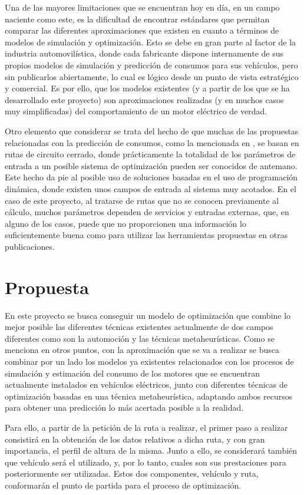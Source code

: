 \documentclass[11pt,spanish,listoffigures,listoftables]{tfgetsinf}
\begin{document}
Una de las mayores limitaciones que se encuentran hoy en día, en un campo naciente como este, es la dificultad de encontrar estándares que permitan comparar las diferentes aproximaciones que existen en cuanto a términos de modelos de simulación y optimización. Esto se debe en gran parte al factor de la industria automovilística, donde cada fabricante dispone internamente de sus propios modelos de simulación y predicción de consumos para sus vehículos, pero sin publicarlos abiertamente, lo cual es lógico desde un punto de vista estratégico y comercial. Es por ello, que los modelos existentes (y a partir de los que se ha desarrollado este proyecto) son aproximaciones realizadas (y en muchos casos muy simplificadas) del comportamiento de un motor eléctrico de verdad.

Otro elemento que considerar se trata del hecho de que muchas de las propuestas relacionadas con la predicción de consumos, como la mencionada en \cite{Bader13}, se basan en rutas de circuito cerrado, donde prácticamente la totalidad de los parámetros de entrada a un posible sistema de optimización pueden ser conocidos de antemano. Este hecho da pie al posible uso de soluciones basadas en el uso de programación dinámica, donde existen unos campos de entrada al sistema muy acotados. En el caso de este proyecto, al tratarse de rutas que no se conocen previamente al cálculo, muchos parámetros dependen de servicios y entradas externas, que, en alguno de los casos, puede que no proporcionen una información lo suficientemente buena como para utilizar las herramientas propuestas en otras publicaciones.

\section{Propuesta}
En este proyecto se busca conseguir un modelo de optimización que combine lo mejor posible las diferentes técnicas existentes actualmente de dos campos diferentes como son la automoción y las técnicas metaheurísticas. Como se menciona en otros puntos, con la aproximación que se va a realizar se busca combinar por un lado los modelos ya existentes relacionados con los procesos de simulación y estimación del consumo de los motores que se encuentran actualmente instalados en vehículos eléctricos, junto con diferentes técnicas de optimización basadas en una técnica metaheurística, adaptando ambos recursos para obtener una predicción lo más acertada posible a la realidad.

Para ello, a partir de la petición de la ruta a realizar, el primer paso a realizar consistirá en la obtención de los datos relativos a dicha ruta, y con gran importancia, el perfil de altura de la misma. Junto a ello, se considerará también que vehículo será el utilizado, y, por lo tanto, cuales son sus prestaciones para posteriormente ser utilizadas. Estos dos componentes, vehículo y ruta, conformarán el punto de partida para el proceso de optimización.
\end{document}
